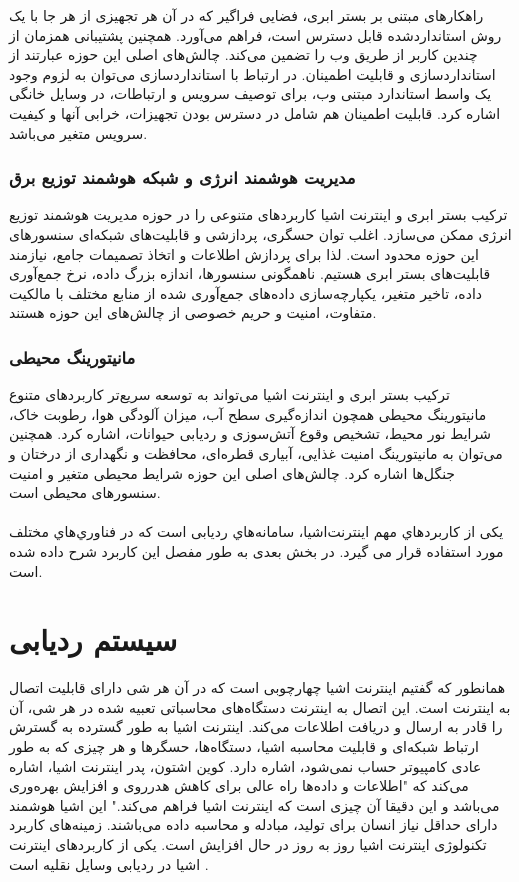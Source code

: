 راهکارهای مبتنی بر بستر ابری، فضایی فراگیر که در آن هر تجهیزی از هر جا با یک روش استانداردشده قابل دسترس است، فراهم می‌آورد. همچنین پشتیبانی همزمان از چندین کاربر از طریق وب را تضمین می‌کند. چالش‌های اصلی این حوزه عبارتند از استانداردسازی و قابلیت اطمینان. در ارتباط با استانداردسازی می‌توان به لزوم وجود یک واسط استاندارد مبتنی وب، برای توصیف سرویس و ارتباطات، در وسایل خانگی اشاره کرد. قابلیت اطمینان هم شامل در دسترس بودن تجهیزات، خرابی آنها و کیفیت سرویس متغیر می‌باشد.
\subsubsection{مدیریت هوشمند انرژی و شبکه هوشمند توزیع برق}
ترکیب بستر ابری و اینترنت اشیا کاربردهای متنوعی را در حوزه مدیریت هوشمند توزیع انرژی ممکن می‌سازد. اغلب توان حسگری، پردازشی و قابلیت‌های شبکه‌ای سنسورهای این حوزه محدود است. لذا برای پردازش اطلاعات و اتخاذ تصمیمات جامع، نیازمند قابلیت‌های بستر ابری هستیم. ناهمگونی سنسورها، اندازه بزرگ داده، نرخ جمع‌آوری داده، تاخیر متغیر، یکپارچه‌سازی داده‌های جمع‌آوری شده از منابع مختلف با مالکیت متفاوت، امنیت و حریم خصوصی از چالش‌های این حوزه هستند.
\subsubsection{مانیتورینگ محیطی}
ترکیب بستر ابری و اینترنت اشیا می‌تواند به توسعه سریع‌تر کاربردهای متنوع مانیتورینگ محیطی همچون اندازه‌گیری سطح آب، میزان آلودگی هوا، رطوبت خاک، شرایط نور محیط، تشخیص وقوع آتش‌سوزی و ردیابی حیوانات، اشاره کرد. همچنین می‌توان به مانیتورینگ امنیت غذایی، آبیاری قطره‌ای، محافظت و نگهداری از درختان و جنگل‌ها اشاره کرد. چالش‌های اصلی این حوزه شرایط محیطی متغیر و امنیت سنسورهای محیطی است.
\\
\\
یکی از کاربردهاي مهم اینترنت‌اشیا، سامانه‌هاي ردیابی است که در فناوري‌هاي مختلف مورد استفاده قرار می گیرد. در بخش بعدی به طور مفصل این کاربرد شرح داده شده است.
\section{سیستم ردیابی}
همانطور که گفتیم اینترنت اشیا چهارچوبی است که در آن هر شی دارای قابلیت اتصال به اینترنت است.
	این اتصال به اینترنت دستگاه‌های محاسباتی تعبیه شده در هر شی، آن را قادر به ارسال و دریافت اطلاعات می‌کند. اینترنت اشیا به طور گسترده به گسترش ارتباط شبکه‌ای و قابلیت محاسبه اشیا، دستگاه‌ها، حسگرها و هر چیزی که به طور عادی کامپیوتر حساب نمی‌شود، اشاره دارد. کوین اشتون، پدر اینترنت اشیا، اشاره می‌کند که "اطلاعات و داده‌ها راه عالی برای کاهش هدرروی و افزایش بهره‌وری می‌باشد و این دقیقا آن چیزی است که اینترنت اشیا فراهم می‌کند." این اشیا هوشمند دارای حداقل نیاز انسان برای تولید، مبادله و محاسبه داده می‌باشند. زمینه‌های کاربرد تکنولوژی اینترنت اشیا روز به روز در حال افزایش است. یکی از کاربردهای اینترنت اشیا در ردیابی وسایل نقلیه است \cite{Mangla2017, Mukhtar2015}.
	
